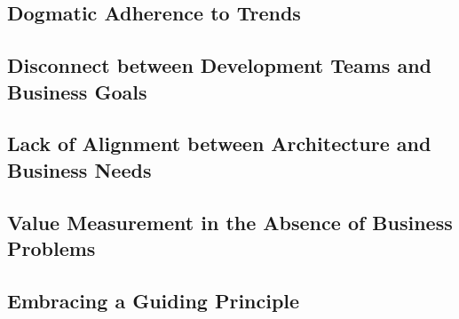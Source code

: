 \documentclass[a4Paper]{article}
\begin{document}
\subsection*{Dogmatic Adherence to Trends}

\subsection*{Disconnect between Development Teams and Business Goals}
\subsection*{Lack of Alignment between Architecture and Business Needs}
\subsection*{Value Measurement in the Absence of Business Problems}
\subsection*{Embracing a Guiding Principle}
\end{document}
